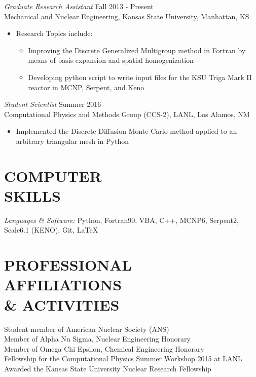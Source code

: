 \documentclass[margin, 10pt]{res} %
\begin{document}
\begin{resume}
{\sl Graduate Research Assistant} \hfill Fall 2013 - Present \\
Mechanical and Nuclear Engineering, Kansas State University, Manhattan, KS
\begin{itemize}
\item Research Topics include:
\begin{itemize}
	\item Improving the Discrete Generalized Multigroup method in Fortran by means of basis expansion and spatial homogenization
    \item Developing python script to write input files for the KSU Triga Mark II reactor in MCNP, Serpent, and Keno
\end{itemize}
\end{itemize}

{\sl Student Scientist} \hfill Summer 2016 \\
Computational Physics and Methods Group (CCS-2), LANL, Los Alamos, NM
\begin{itemize}
\item Implemented the Discrete Diffusion Monte Carlo method applied to an arbitrary triangular mesh in Python
\end{itemize}

\section{COMPUTER \\ SKILLS}

{\sl Languages \& Software:}
Python, Fortran90, VBA, C++, MCNP6, Serpent2, Scale6.1 (KENO), Git, \LaTeX  \\

\section{PROFESSIONAL \\ AFFILIATIONS  \\ \& ACTIVITIES}

Student member of American Nuclear Society (ANS) \\
Member of Alpha Nu Sigma, Nuclear Engineering Honorary \\
Member of Omega Chi Epsilon, Chemical Engineering Honorary\\
Fellowship for the Computational Physics Summer Workshop 2015 at LANL\\
Awarded the Kansas State University Nuclear Research Fellowship


\end{resume}
\end{document}
